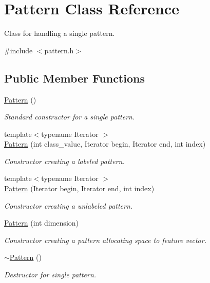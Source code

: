 \hypertarget{classPattern}{\section{Pattern Class Reference}
\label{classPattern}
}


Class for handling a single pattern.  




{\ttfamily \#include $<$pattern.\+h$>$}

\subsection*{Public Member Functions}
\begin{DoxyCompactItemize}
\item 
\hyperlink{classPattern_a95f42b0f1717d9e6c2d831e87d27f83c}{Pattern} ()
\begin{DoxyCompactList}\small\item\em Standard constructor for a single pattern. \end{DoxyCompactList}\item 
{\footnotesize template$<$typename Iterator $>$ }\\\hyperlink{classPattern_a3cf22799a811394bab7fd167727a16af}{Pattern} (int class\+\_\+value, Iterator begin, Iterator end, int index)
\begin{DoxyCompactList}\small\item\em Constructor creating a labeled pattern. \end{DoxyCompactList}\item 
{\footnotesize template$<$typename Iterator $>$ }\\\hyperlink{classPattern_a87dcb126d751b5520a710dbf3e4eb7c0}{Pattern} (Iterator begin, Iterator end, int index)
\begin{DoxyCompactList}\small\item\em Constructor creating a unlabeled pattern. \end{DoxyCompactList}\item 
\hyperlink{classPattern_a3a1bf7ddd196fac02018c9cde4c421cf}{Pattern} (int dimension)
\begin{DoxyCompactList}\small\item\em Constructor creating a pattern allocating space to feature vector. \end{DoxyCompactList}\item 
\hyperlink{classPattern_a6e8b9388bbd39934e9f9534b974d7498}{$\sim$\+Pattern} ()
\begin{DoxyCompactList}\small\item\em Destructor for single pattern. \end{DoxyCompactList}\item 

\end{DoxyCompactItemize}
